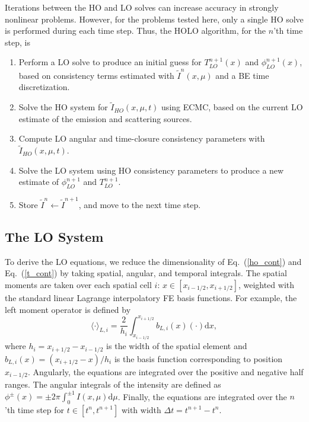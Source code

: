 \documentclass{anstrans}
\renewcommand{\eqref}[1]{(\ref{#1})}
\renewcommand{\d}{\mathrm{d}}
\newcommand{\mom}[1]{\langle #1 \rangle}
\newcommand{\xr}{{x_{i+1/2}}}
\begin{document}
Iterations between the HO and LO solves can increase accuracy in strongly nonlinear
problems. However, for the problems tested here, only a single HO solve is performed during each
time step.  Thus, the HOLO algorithm, for the $n$'th time step, is
\begin{enumerate}
    \item Perform a LO solve to produce an initial guess for $T_{LO}^{n+1}(x)$
        and $\phi_{LO}^{n+1}(x)$, based on consistency terms estimated with
        $\tilde{I}^{n}(x,\mu)$ and a BE time
    discretization.
\item Solve the HO system for $\tilde{I}_{HO}(x,\mu,t)$ using ECMC, based on the current
    LO estimate of the emission and scattering sources.%
\item Compute LO angular and time-closure consistency parameters with
    $\tilde{I}_{HO}(x,\mu,t)$.  
\item Solve the LO system using HO consistency parameters to produce a new
    estimate of $\phi^{n+1}_{LO}$ and $T^{n+1}_{LO}$.
\item Store $\tilde{I}^{n}\leftarrow\tilde{I}^{n+1}$, and move to the next time step.
\end{enumerate}

\subsection*{The LO System}
\label{sec:lo}

To derive the LO equations, we reduce the dimensionality of Eq.~\eqref{ho_cont} and
Eq.~\eqref{t_cont} by taking spatial, angular, and
temporal integrals.  The spatial moments are taken over each spatial cell $i$:
$x\in[x_{i-1/2},x_{i+1/2}]$, weighted with the standard linear Lagrange interpolatory FE basis functions.  For example, the left moment operator is defined by
\begin{equation}\label{x_mom}
    \mom{\cdot}_{L,i} = \frac{2}{h_i} \int_{x_{i-1/2}}^{\xr} b_{L,i}(x) (\cdot) \d x,
\end{equation}
where $h_i=x_{i+1/2}-x_{i-1/2}$ is the width of the spatial element and
$b_{L,i}(x)=(x_{i+1/2}-x)/h_i$ is the basis function corresponding to position
$x_{i-1/2}$. Angularly, the equations are integrated over the positive and negative half
ranges.  The angular integrals of the intensity are defined as $\phi^\pm(x) = \pm2\pi
\int_0^{\pm 1} I(x,\mu) \d \mu$.  Finally, the equations are integrated over the $n$'th
time step for $t\in[t^n,t^{n+1}]$ with width $\Delta t = t^{n+1}-t^{n}$.  
\end{document}
